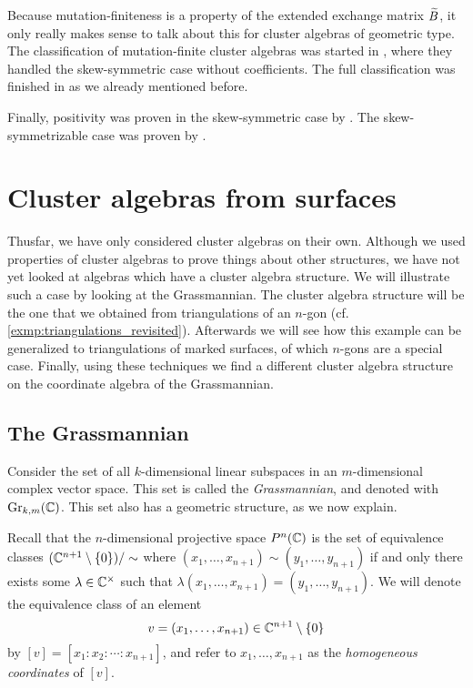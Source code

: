 Because mutation-finiteness is a property of the extended exchange matrix $\widetilde{B}$, it
only really makes sense to talk about this for cluster algebras of geometric type. The
classification of mutation-finite cluster algebras was started in
\cite{FeliksonShapiroTumarkin2012SkewSCA}, where they handled the skew-symmetric case
without coefficients. The full classification was finished in
\cite{FeliksonPavel2023cluster} as we already mentioned before.

Finally, positivity was proven in the skew-symmetric case by
\textcite{LeeSchiffler2015PositivityCA}. The skew-symmetrizable case was proven by
\textcite{GrossHackingKeelKontsevich2018CanonicalBCA}.

\section{Cluster algebras from surfaces}\label{sec:cluster_algebras_surfaces}

Thusfar, we have only considered cluster algebras on their own. Although we used
properties of cluster algebras to prove things about other structures, we have not yet
looked at algebras which have a cluster algebra structure. We will illustrate such a
case by looking at the Grassmannian. The cluster algebra structure will be the one that
we obtained from triangulations of an $n$-gon (cf.
\cref{exmp:triangulations_revisited}). Afterwards we will see how this example can be
generalized to triangulations of marked surfaces, of which $n$-gons are a special case.
Finally, using these techniques we find a different cluster algebra structure on the
coordinate algebra of the Grassmannian.

\subsection{The Grassmannian}

Consider the set of all $k$-dimensional linear subspaces in an $m$-dimensional complex
vector space. This set is called the \emph{Grassmannian}, and
denoted with $\operatorname{Gr}_{k,m}(\mathbb{C})$. This set also has a
geometric structure, as we now explain.

Recall that the $n$-dimensional projective space $P^n(\mathbb{C})$ is the set of equivalence
classes $(\mathbb{C}^{n+1} \setminus \{0\}) / \sim$ where $ (x_1, \dots, x_{n+1}) \sim (y_1,
	\dots, y_{n+1})$ if and only there exists some $\lambda \in \mathbb{C}^\times$ such that
$\lambda(x_1, \dots, x_{n+1}) = (y_1, \dots, y_{n+1})$. We will denote the equivalence
class of an element
\begin{equation*}
	v = (x_1, \dots, x_{n+1}) \in \mathbb{C}^{n+1} \setminus \{0\}
\end{equation*}
%
by $[v] = [x_1 \colon x_2 \colon \dotsb \colon x_{n+1}]$, and refer to $x_1, \dots,
	x_{n+1}$ as the \emph{homogeneous coordinates} of $[v]$.

